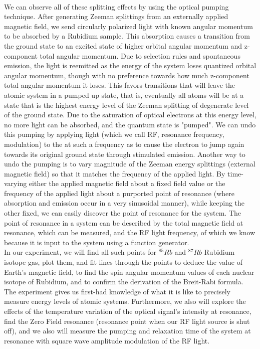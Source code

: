 \documentclass{article}
\begin{document}
    \\\indent We can observe all of these splitting effects by using the optical pumping technique. After generating Zeeman splittings from an externally applied magnetic field, we send circularly polarized light with known angular momentum to be absorbed by a Rubidium sample. This absorption causes a transition from the ground state to an excited state of higher orbital angular momentum and z-component total angular momentum. Due to selection rules and spontaneous emission, the light is reemitted as the energy of the system loses quantized orbital angular momentum, though with no preference towards how much z-component total angular momentum it loses. This favors transitions that will leave the atomic system in a pumped up state, that is, eventually all atoms will be at a state that is the highest energy level of the Zeeman splitting of degenerate level of the ground state. Due to the saturation of optical electrons at this energy level, no more light can be absorbed, and the quantum state is "pumped". We can undo this pumping by applying light (which we call RF, resonance frequency, modulation) to the at such a frequency as to cause the electron to jump again towards its original ground state through stimulated emission. Another way to undo the pumping is to vary magnitude of the Zeeman energy splittings (external magnetic field) so that it matches the frequency of the applied light. By time-varying either the applied magnetic field about a fixed field value or the frequency of the applied light about a purported point of resonance (where absorption and emission occur in a very sinusoidal manner), while keeping the other fixed, we can easily discover the point of resonance for the system. The point of resonance in a system can be described by the total magnetic field at resonance, which can be measured, and the RF light frequency, of which we know because it is input to the system using a function generator. 
    \\\indent In our experiment, we will find all such points for $^{85}Rb$ and $^{87}Rb$ Rubidium isotope gas, plot them, and fit lines through the points to deduce the value of Earth's magnetic field, to find the spin angular momentum values of each nuclear isotope of Rubidium, and to confirm the derivation of the Breit-Rabi formula. The experiment gives us first-had knowledge of what it is like to precisely measure energy levels of atomic systems. Furthermore, we also will explore the effects of the temperature variation of the optical signal's intensity %
    at resonance, find the Zero Field resonance (resonance point when our RF light source is shut off), and we also will measure the pumping and relaxation time of the system at resonance with square wave amplitude modulation of the RF light. 
\end{document}
